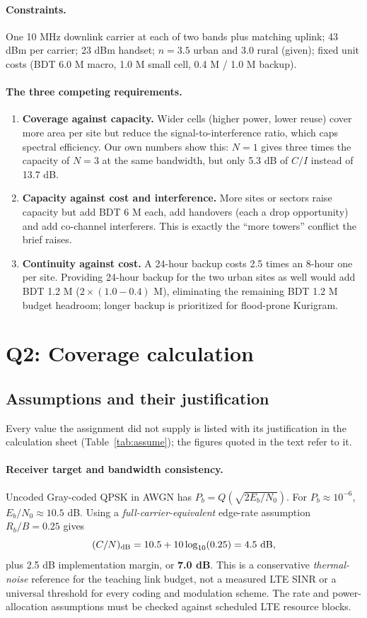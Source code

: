 \documentclass[9pt,a4paper]{extarticle}
\newcommand{\key}[1]{\textbf{#1}}
\begin{document}
\paragraph{Constraints.} One 10 MHz downlink carrier at each of two bands plus matching uplink;
43 dBm per carrier; 23 dBm handset; $n=3.5$ urban and $3.0$ rural (given); fixed unit costs
(BDT 6.0 M macro, 1.0 M small cell, 0.4 M / 1.0 M backup).

\paragraph{The three competing requirements.}
\begin{enumerate}[leftmargin=1.4em,itemsep=1pt,topsep=2pt]
\item \textbf{Coverage against capacity.} Wider cells (higher power, lower reuse) cover more area
per site but reduce the signal-to-interference ratio, which caps spectral efficiency. Our own
numbers show this: $N=1$ gives three times the capacity of $N=3$ at the same bandwidth, but only
5.3 dB of $C/I$ instead of 13.7 dB.
\item \textbf{Capacity against cost and interference.} More sites or sectors raise capacity but
add BDT 6 M each, add handovers (each a drop opportunity) and add co-channel interferers. This is
exactly the ``more towers'' conflict the brief raises.
\item \textbf{Continuity against cost.} A 24-hour backup costs 2.5 times an 8-hour one per site.
Providing 24-hour backup for the two urban sites as well would add BDT 1.2 M
($2\times(1.0-0.4)$ M), eliminating the remaining BDT 1.2 M budget headroom;
longer backup is prioritized for flood-prone Kurigram.
\end{enumerate}

\section{Q2: Coverage calculation}
\label{sec:q2}

\subsection{Assumptions and their justification}
Every value the assignment did not supply is listed with its justification in the calculation
sheet (Table~\ref{tab:assume}); the figures quoted in the text refer to it.

\paragraph{Receiver target and bandwidth consistency.} Uncoded Gray-coded QPSK in AWGN
has $P_b=Q(\sqrt{2E_b/N_0})$. For $P_b\approx10^{-6}$, $E_b/N_0\approx10.5$ dB.
Using a \emph{full-carrier-equivalent} edge-rate assumption $R_b/B=0.25$ gives
\[
(C/N)_{\rm dB}=10.5+10\log_{10}(0.25)=4.5\ \text{dB},
\]
plus 2.5 dB implementation margin, or \key{7.0 dB}. This is a conservative
\emph{thermal-noise} reference for the teaching link budget, not a measured LTE SINR
or a universal threshold for every coding and modulation scheme. The rate and
power-allocation assumptions must be checked against scheduled LTE resource blocks.
\end{document}
